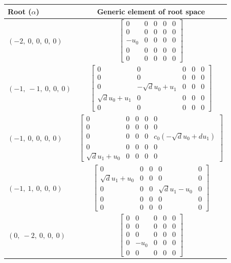 \documentclass[11pt]{article}
\theoremstyle{definition}
\begin{document}
\noindent \begin{tabular}{|l|c|}
    \hline
    \textbf{Root ($\alpha$)} & \textbf{Generic element of root space} \\
    \hline
    $\left( -2, \  0, \  0, \  0, \  0\right)$ & $\left[\begin{matrix}0 & 0 & 0 & 0 & 0\\0 & 0 & 0 & 0 & 0\\- u_{0} & 0 & 0 & 0 & 0\\0 & 0 & 0 & 0 & 0\\0 & 0 & 0 & 0 & 0\end{matrix}\right]$ \\
    \hline
    $\left( -1, \  -1, \  0, \  0, \  0\right)$ & $\left[\begin{matrix}0 & 0 & 0 & 0 & 0\\0 & 0 & 0 & 0 & 0\\0 & - \sqrt{d} u_{0} + u_{1} & 0 & 0 & 0\\\sqrt{d} u_{0} + u_{1} & 0 & 0 & 0 & 0\\0 & 0 & 0 & 0 & 0\end{matrix}\right]$ \\
    \hline
    $\left( -1, \  0, \  0, \  0, \  0\right)$ & $\left[\begin{matrix}0 & 0 & 0 & 0 & 0\\0 & 0 & 0 & 0 & 0\\0 & 0 & 0 & 0 & c_{0} \left(- \sqrt{d} u_{0} + d u_{1}\right)\\0 & 0 & 0 & 0 & 0\\\sqrt{d} u_{1} + u_{0} & 0 & 0 & 0 & 0\end{matrix}\right]$ \\
    \hline
    $\left( -1, \  1, \  0, \  0, \  0\right)$ & $\left[\begin{matrix}0 & 0 & 0 & 0 & 0\\\sqrt{d} u_{1} + u_{0} & 0 & 0 & 0 & 0\\0 & 0 & 0 & \sqrt{d} u_{1} - u_{0} & 0\\0 & 0 & 0 & 0 & 0\\0 & 0 & 0 & 0 & 0\end{matrix}\right]$ \\
    \hline
    $\left( 0, \  -2, \  0, \  0, \  0\right)$ & $\left[\begin{matrix}0 & 0 & 0 & 0 & 0\\0 & 0 & 0 & 0 & 0\\0 & 0 & 0 & 0 & 0\\0 & - u_{0} & 0 & 0 & 0\\0 & 0 & 0 & 0 & 0\end{matrix}\right]$ \\

\end{tabular}
\end{document}
